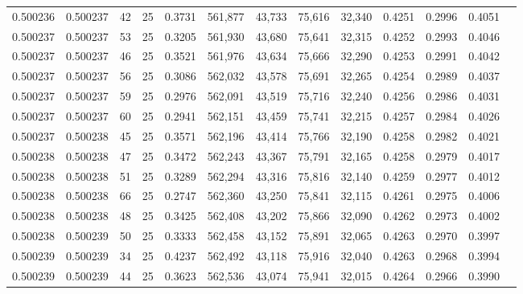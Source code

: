\begin{tabular}{rrrrrrrrrrrrr}
0.500236 & 0.500237 &    42 &  25 &                                     0.3731 & 561,877 &  43,733 &  75,616 &  32,340 & 0.4251 & 0.2996 & 0.4051 \\
0.500237 & 0.500237 &    53 &  25 &                                     0.3205 & 561,930 &  43,680 &  75,641 &  32,315 & 0.4252 & 0.2993 & 0.4046 \\
0.500237 & 0.500237 &    46 &  25 &                                     0.3521 & 561,976 &  43,634 &  75,666 &  32,290 & 0.4253 & 0.2991 & 0.4042 \\
0.500237 & 0.500237 &    56 &  25 &                                     0.3086 & 562,032 &  43,578 &  75,691 &  32,265 & 0.4254 & 0.2989 & 0.4037 \\
0.500237 & 0.500237 &    59 &  25 &                                     0.2976 & 562,091 &  43,519 &  75,716 &  32,240 & 0.4256 & 0.2986 & 0.4031 \\
0.500237 & 0.500237 &    60 &  25 &                                     0.2941 & 562,151 &  43,459 &  75,741 &  32,215 & 0.4257 & 0.2984 & 0.4026 \\
0.500237 & 0.500238 &    45 &  25 &                                     0.3571 & 562,196 &  43,414 &  75,766 &  32,190 & 0.4258 & 0.2982 & 0.4021 \\
0.500238 & 0.500238 &    47 &  25 &                                     0.3472 & 562,243 &  43,367 &  75,791 &  32,165 & 0.4258 & 0.2979 & 0.4017 \\
0.500238 & 0.500238 &    51 &  25 &                                     0.3289 & 562,294 &  43,316 &  75,816 &  32,140 & 0.4259 & 0.2977 & 0.4012 \\
0.500238 & 0.500238 &    66 &  25 &                                     0.2747 & 562,360 &  43,250 &  75,841 &  32,115 & 0.4261 & 0.2975 & 0.4006 \\
0.500238 & 0.500238 &    48 &  25 &                                     0.3425 & 562,408 &  43,202 &  75,866 &  32,090 & 0.4262 & 0.2973 & 0.4002 \\
0.500238 & 0.500239 &    50 &  25 &                                     0.3333 & 562,458 &  43,152 &  75,891 &  32,065 & 0.4263 & 0.2970 & 0.3997 \\
0.500239 & 0.500239 &    34 &  25 &                                     0.4237 & 562,492 &  43,118 &  75,916 &  32,040 & 0.4263 & 0.2968 & 0.3994 \\
0.500239 & 0.500239 &    44 &  25 &                                     0.3623 & 562,536 &  43,074 &  75,941 &  32,015 & 0.4264 & 0.2966 & 0.3990 \\

\end{tabular}
